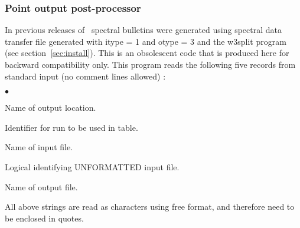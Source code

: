 \vsssub
\subsubsection{Point output post-processor} \label{sec:ww3outp}
\vsssub



\vspace{\baselineskip} 
\vspace{\baselineskip} 
\noindent 
In previous releases of \ws\ spectral bulletins were generated using spectral
data transfer file generated with {\F itype = 1} and {\F otype = 3} and the
{\file w3split} program (see section~\ref{sec:install}). This is an
obsolescent code that is produced here for backward compatibility only.  This
program reads the following five records from standard input (no comment lines
allowed) :

\begin{list}{$\bullet$}{\itemsep 0mm \parsep 0mm}
\item Name of output location.
\item Identifier for run to be used in table.
\item Name of input file.
\item Logical identifying UNFORMATTED input file.
\item Name of output file.
\end{list}

\noindent
All above strings are read as characters using free format, and therefore need
to be enclosed in quotes.

\pb